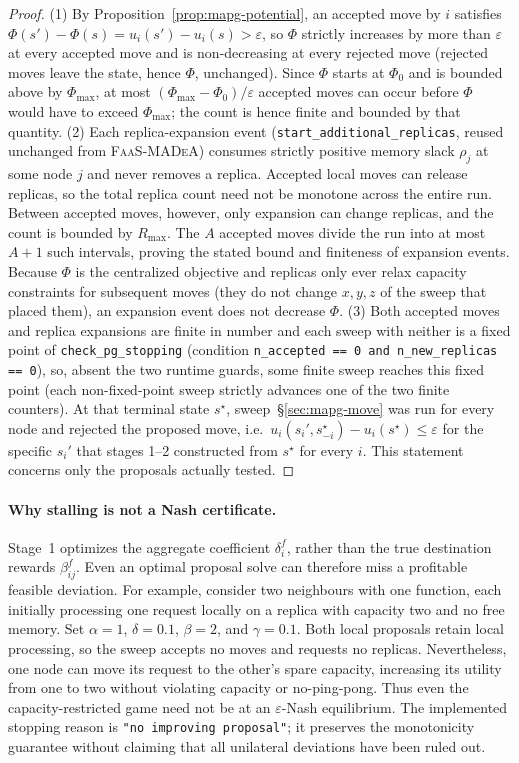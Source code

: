 \begin{proof}
(1) By Proposition~\ref{prop:mapg-potential}, an accepted move by $i$
satisfies $\Phi(s')-\Phi(s)=u_i(s')-u_i(s)>\varepsilon$, so $\Phi$ strictly
increases by more than $\varepsilon$ at every accepted move and is
non-decreasing at every rejected move (rejected moves leave the state, hence
$\Phi$, unchanged). Since $\Phi$ starts at $\Phi_0$ and is bounded above by
$\Phi_{\max}$, at most $(\Phi_{\max}-\Phi_0)/\varepsilon$ accepted moves can
occur before $\Phi$ would have to exceed $\Phi_{\max}$; the count is hence
finite and bounded by that quantity.
(2) Each replica-expansion event (\texttt{start\_additional\_replicas},
reused unchanged from \textsc{FaaS-MADeA}) consumes strictly positive memory
slack $\rho_j$ at some node $j$ and never removes a replica. Accepted local
moves can release replicas, so the total replica count need not be monotone
across the entire run. Between accepted moves, however, only expansion can
change replicas, and the count is bounded by $R_{\max}$. The $A$ accepted
moves divide the run into at most $A+1$ such intervals, proving the stated
bound and finiteness of expansion events. Because
$\Phi$ is the centralized objective and replicas only ever relax capacity
constraints for subsequent moves (they do not change $x,y,z$ of the sweep
that placed them), an expansion event does not decrease $\Phi$.
(3) Both accepted moves and replica expansions are finite in number and each
sweep with neither is a fixed point of \texttt{check\_pg\_stopping}
(condition \texttt{n\_accepted == 0 and n\_new\_replicas == 0}), so, absent
the two runtime guards, some finite sweep reaches this fixed point (each
non-fixed-point sweep strictly advances one of the two finite counters). At
that terminal state $s^\star$, sweep~\S\ref{sec:mapg-move} was run for every
node and rejected the proposed move, i.e.\ $u_i(s_i',s_{-i}^\star)-u_i(s^\star)\le\varepsilon$
for the specific $s_i'$ that stages 1--2 constructed from $s^\star$ for every
$i$. This statement concerns only the proposals actually tested.
\end{proof}

\paragraph{Why stalling is not a Nash certificate.}
Stage~1 optimizes the aggregate coefficient $\delta_i^f$, rather than the
true destination rewards $\beta_{ij}^f$. Even an optimal proposal solve can
therefore miss a profitable feasible deviation. For example, consider two
neighbours with one function, each initially processing one request locally
on a replica with capacity two and no free memory. Set $\alpha=1$,
$\delta=0.1$, $\beta=2$, and $\gamma=0.1$. Both local proposals retain local
processing, so the sweep accepts no moves and requests no replicas.
Nevertheless, one node can move its request to the other's spare capacity,
increasing its utility from one to two without violating capacity or
no-ping-pong. Thus even the capacity-restricted game need not be at an
$\varepsilon$-Nash equilibrium. The implemented stopping reason is
\texttt{"no improving proposal"}; it preserves the monotonicity guarantee
without claiming that all unilateral deviations have been ruled out.

